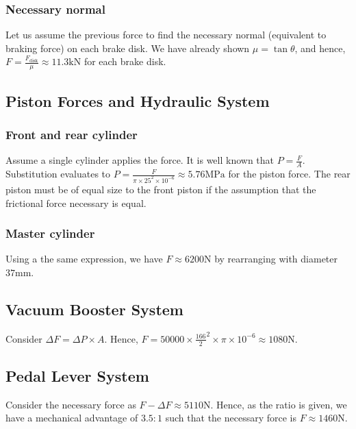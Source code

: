 \documentclass[../main.tex]{subfiles}
\begin{document}
\subsubsection{Necessary normal}
Let us assume the previous force to find the necessary normal (equivalent to braking force) on each brake disk.
We have already shown $\mu=\tan\theta$, and hence, $F = \frac{F_\text{disk}}{\mu} \approx 11.3 \mathrm{kN}$ for each brake disk.

\subsection{Piston Forces and Hydraulic System}
\subsubsection{Front and rear cylinder}
Assume a single cylinder applies the force.
It is well known that $P = \frac{F}{A}$.
Substitution evaluates to $P = \frac{F}{\pi\times25^2\times10^{-6}} \approx 5.76 \mathrm{MPa}$ for the piston force.
The rear piston must be of equal size to the front piston if the assumption that the frictional force necessary is equal.
\subsubsection{Master cylinder}
Using a the same expression, we have $F \approx 6200 \mathrm{N}$ by rearranging with diameter $37 \mathrm{mm}$.

\subsection{Vacuum Booster System}
Consider $\Delta F=\Delta P \times A$.
Hence, $F = 50000\times \frac{166}{2}^2\times\pi\times 10^{-6} \approx 1080 \mathrm{N}$.

\subsection{Pedal Lever System}
Consider the necessary force as $F-\Delta F \approx 5110 \mathrm{N}$.
Hence, as the ratio is given, we have a mechanical advantage of $3.5:1$ such that the necessary force is $F\approx1460 \mathrm{N}$.
\end{document}
